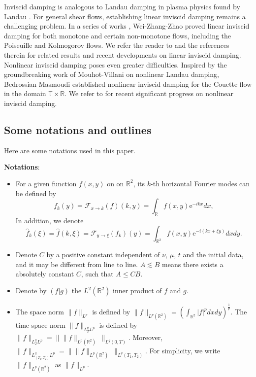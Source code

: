 \documentclass[reqno, 12pt]{amsart} %
\theoremstyle{plain} %
\theoremstyle{definition}
\theoremstyle{remark}
\numberwithin{equation}{section} %
\begin{document}
	Inviscid damping is analogous to Landau damping in plasma physics found by Landau \cite{L1946}. For general shear flows, establishing linear inviscid damping remains a challenging problem. In a series of works \cite{WZZ2018,WZZ2019,WZZ202001}, Wei-Zhang-Zhao proved linear inviscid damping for both monotone and certain non-monotone flows, including the Poiseuille and Kolmogorov flows. We refer the reader to \cite{O1907,BZV2019,ZZ2019,J2020,WZZ202002,Z2016} and the references therein for related results and recent developments on linear inviscid damping. Nonlinear inviscid damping poses even greater difficulties. Inspired by the groundbreaking work of Mouhot-Villani \cite{MV2011} on nonlinear Landau damping, Bedrossian-Masmoudi \cite{BM2015} established nonlinear inviscid damping for the Couette flow in the domain $ \mathbb{T} \times \mathbb{R}$. We refer to \cite{IJ2020,IJ2022,IJ2023,DM2023,MZ202001} for recent significant progress on nonlinear inviscid damping.
	
	 
	
	
	
	\subsection{Some notations and outlines}
	
	Here are some notations used in this paper.
	
	\noindent\textbf{Notations}:
	\begin{itemize}
		\item For a given function $f(x,y)$ on on $\mathbb{R}^2$, its $k$-th horizontal Fourier modes can be defined by
		\begin{equation*}
			f_k(y)=\mathcal{F}_{x \rightarrow k}(f)(k, y) = \int_{\mathbb{R}} f(x, y) \mathrm{e}^{- ikx} dx,
		\end{equation*}
		In addition, we denote 
		$$
		\hat{f}_k(\xi)=\hat{f}(k, \xi) = \mathcal{F}_{y \rightarrow \xi}(f_k)(y) = \int_{\mathbb{R}^2} f(x, y) \mathrm{e}^{- i(kx + \xi y)} dxdy.
		$$
		\item Denote $C$ by  a positive constant independent of $\nu$, $\mu$, $t$ and the initial data, and it may be different from line to line. $A \lesssim B$ means there exists a absolutely constant $C$, such that $A \leq C B$.
		\item Denote by $(f | g)$ the $L^2\left(\mathbb{R}^2\right)$ inner product of $f$ and $g$.
		\item The space norm $\|f\|_{L^{p}}$ is defined by	
		$\|f\|_{L^{p}(\mathbb{R}^2)}=\left(\int_{\mathbb{R}^2}|f|^p dxdy\right)^{\frac{1}{p}}  $. The time-space norm $\|f\|_{L_T^{q}L^{p}}$ is defined by	
		$\|f\|_{L_T^qL^p}=\|\|f\|_{L^p(\mathbb{R}^2)}\ \|_{L^q(0,T)}$.
		Moreover, $\|f\|_{L_{(T_1, T_2)}^qL^p}=\|\|f\|_{L^p(\mathbb{R}^2)}\ \|_{L^q(T_1,T_2)}$. For simplicity, we write $\|f\|_{L^p(\mathbb{R}^2)}$ as $\|f\|_{L^p}.$
	\end{itemize}
	
\end{document}
